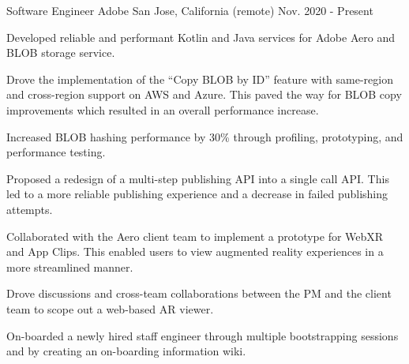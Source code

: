 


\begin{cventries}


\cventry
{Software Engineer} %
{Adobe} %
{San Jose, California (remote)} %
{Nov. 2020 - Present} %
{ %
\begin{cvitems}
\item {Developed reliable and performant Kotlin and Java services for Adobe Aero and BLOB storage service.}
\item {Drove the implementation of the ``Copy BLOB by ID'' feature with same-region and cross-region support on AWS and Azure. This paved the way for BLOB copy improvements which resulted in an overall performance increase.}
\item {Increased BLOB hashing performance by 30\% through profiling, prototyping, and performance testing.}
\item {Proposed a redesign of a multi-step publishing API into a single call API. This led to a more reliable publishing experience and a decrease in failed publishing attempts.}
\item {Collaborated with the Aero client team to implement a prototype for WebXR and App Clips. This enabled users to view augmented reality experiences in a more streamlined manner.}
\item {Drove discussions and cross-team collaborations between the PM and the client team to scope out a web-based AR viewer.}
\item {On-boarded a newly hired staff engineer through multiple bootstrapping sessions and by creating an on-boarding information wiki.}
\end{cvitems}
}



\end{cventries}
